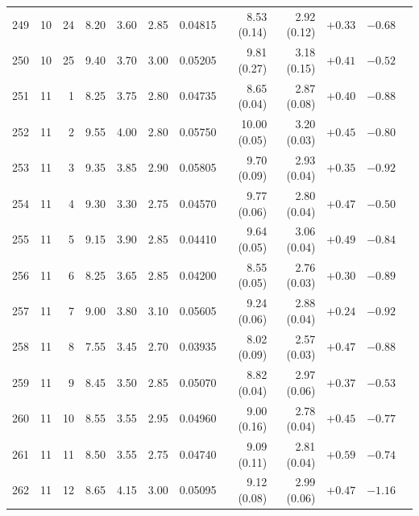 \begin{longtable}{@{}rrrrrrrrrrrr@{}}
249 & 10 & 24 & \num{8.20} & \num{3.60} & \num{2.85} & \num{0.04815} & \num{8.53} (\num{0.14}) & \num{2.92} (\num{0.12}) & $+\num{0.33}$ & $-\num{0.68}$ &  \\
250 & 10 & 25 & \num{9.40} & \num{3.70} & \num{3.00} & \num{0.05205} & \num{9.81} (\num{0.27}) & \num{3.18} (\num{0.15}) & $+\num{0.41}$ & $-\num{0.52}$ &  \\
251 & 11 & 1 & \num{8.25} & \num{3.75} & \num{2.80} & \num{0.04735} & \num{8.65} (\num{0.04}) & \num{2.87} (\num{0.08}) & $+\num{0.40}$ & $-\num{0.88}$ &  \\
252 & 11 & 2 & \num{9.55} & \num{4.00} & \num{2.80} & \num{0.05750} & \num{10.00} (\num{0.05}) & \num{3.20} (\num{0.03}) & $+\num{0.45}$ & $-\num{0.80}$ &  \\
253 & 11 & 3 & \num{9.35} & \num{3.85} & \num{2.90} & \num{0.05805} & \num{9.70} (\num{0.09}) & \num{2.93} (\num{0.04}) & $+\num{0.35}$ & $-\num{0.92}$ &  \\
254 & 11 & 4 & \num{9.30} & \num{3.30} & \num{2.75} & \num{0.04570} & \num{9.77} (\num{0.06}) & \num{2.80} (\num{0.04}) & $+\num{0.47}$ & $-\num{0.50}$ &  \\
255 & 11 & 5 & \num{9.15} & \num{3.90} & \num{2.85} & \num{0.04410} & \num{9.64} (\num{0.05}) & \num{3.06} (\num{0.04}) & $+\num{0.49}$ & $-\num{0.84}$ &  \\
256 & 11 & 6 & \num{8.25} & \num{3.65} & \num{2.85} & \num{0.04200} & \num{8.55} (\num{0.05}) & \num{2.76} (\num{0.03}) & $+\num{0.30}$ & $-\num{0.89}$ &  \\
257 & 11 & 7 & \num{9.00} & \num{3.80} & \num{3.10} & \num{0.05605} & \num{9.24} (\num{0.06}) & \num{2.88} (\num{0.04}) & $+\num{0.24}$ & $-\num{0.92}$ &  \\
258 & 11 & 8 & \num{7.55} & \num{3.45} & \num{2.70} & \num{0.03935} & \num{8.02} (\num{0.09}) & \num{2.57} (\num{0.03}) & $+\num{0.47}$ & $-\num{0.88}$ &  \\
259 & 11 & 9 & \num{8.45} & \num{3.50} & \num{2.85} & \num{0.05070} & \num{8.82} (\num{0.04}) & \num{2.97} (\num{0.06}) & $+\num{0.37}$ & $-\num{0.53}$ &  \\
260 & 11 & 10 & \num{8.55} & \num{3.55} & \num{2.95} & \num{0.04960} & \num{9.00} (\num{0.16}) & \num{2.78} (\num{0.04}) & $+\num{0.45}$ & $-\num{0.77}$ &  \\
261 & 11 & 11 & \num{8.50} & \num{3.55} & \num{2.75} & \num{0.04740} & \num{9.09} (\num{0.11}) & \num{2.81} (\num{0.04}) & $+\num{0.59}$ & $-\num{0.74}$ &  \\
262 & 11 & 12 & \num{8.65} & \num{4.15} & \num{3.00} & \num{0.05095} & \num{9.12} (\num{0.08}) & \num{2.99} (\num{0.06}) & $+\num{0.47}$ & $-\num{1.16}$ &  \\

\end{longtable}
